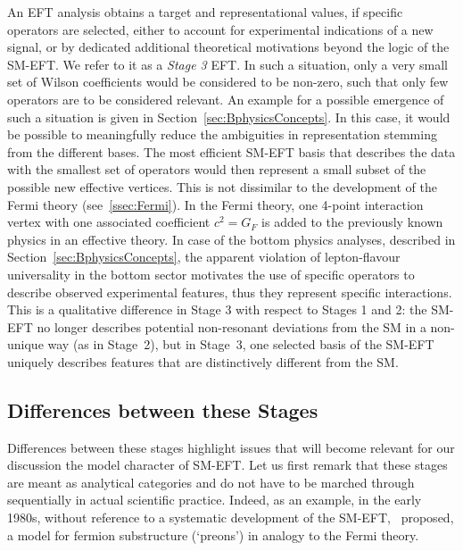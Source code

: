 An EFT analysis obtains a target and representational values, 
if specific operators are selected, either to account for
experimental indications of a new signal, or by dedicated additional theoretical 
motivations beyond the logic of the SM-EFT. 
We refer to it as a \emph{Stage 3} EFT.  
In such a situation, only a very small set
of Wilson coefficients would be considered to be non-zero, 
such that only few operators are to be considered relevant.
An example for a possible emergence of such a
situation is given in Section~\ref{sec:BphysicsConcepts}.
In this case, it would be possible to meaningfully reduce the
ambiguities in representation stemming from the different bases. The
most efficient SM-EFT basis that describes the data with the
smallest set of operators would then represent a small subset of the
possible new effective vertices.  This is not dissimilar to the
development of the Fermi theory (see~\ref{ssec:Fermi}). In the Fermi
theory, one 4-point interaction vertex with one associated coefficient
$c^2=G_F$ is added to the previously known physics in an effective
theory. 
In case of the bottom physics analyses, described in Section~\ref{sec:BphysicsConcepts}, the apparent
violation of lepton-flavour universality in the bottom sector motivates
the use of specific operators to describe observed experimental
features, thus they represent specific interactions. This is a
qualitative difference in Stage 3 with respect to Stages 1 and 2: the SM-EFT
no longer describes potential non-resonant deviations from the
SM in a non-unique way (as in Stage~2), 
but in Stage~3, one selected basis of the SM-EFT uniquely describes features that are distinctively different from the SM.

\subsection{Differences between these Stages}

Differences between these stages highlight issues that will become
relevant for our discussion the model character of SM-EFT.
Let us first remark that these stages are meant as analytical categories and do not have to be 
marched through sequentially in actual scientific practice.
Indeed, as an example, in the early 1980s, without reference to
a systematic development of the SM-EFT,~\cite{Eichten:1983hw} proposed,
a model for fermion substructure (`preons') in analogy to the Fermi theory.

